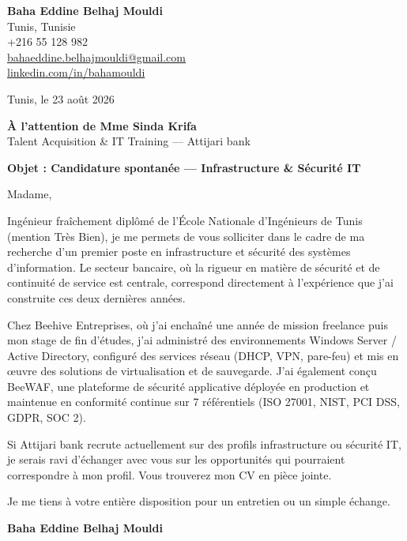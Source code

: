 \documentclass[a4paper,11pt]{article}
\begin{document}
\begin{flushright}
{\bfseries Baha Eddine Belhaj Mouldi}\\
Tunis, Tunisie\\
+216 55 128 982\\
\href{mailto:bahaeddine.belhajmouldi@gmail.com}{bahaeddine.belhajmouldi@gmail.com}\\
\href{https://linkedin.com/in/bahamouldi}{linkedin.com/in/bahamouldi}
\end{flushright}
\vspace{0.8cm}
\begin{flushleft}
Tunis, le 23 ao\^ut 2026
\vspace{0.8cm}

{\bfseries \`A l'attention de Mme Sinda Krifa}\\
Talent Acquisition \& IT Training --- Attijari bank
\vspace{0.6cm}

{\bfseries Objet : Candidature spontan\'ee --- Infrastructure \& S\'ecurit\'e IT}
\end{flushleft}
\vspace{0.6cm}
Madame,

Ing\'enieur fra\^ichement dipl\^om\'e de l'\'Ecole Nationale d'Ing\'enieurs de Tunis (mention Tr\`es Bien), je me permets de vous solliciter dans le cadre de ma recherche d'un premier poste en infrastructure et s\'ecurit\'e des syst\`emes d'information. Le secteur bancaire, o\`u la rigueur en mati\`ere de s\'ecurit\'e et de continuit\'e de service est centrale, correspond directement \`a l'exp\'erience que j'ai construite ces deux derni\`eres ann\'ees.

Chez Beehive Entreprises, o\`u j'ai encha\^in\'e une ann\'ee de mission freelance puis mon stage de fin d'\'etudes, j'ai administr\'e des environnements Windows Server / Active Directory, configur\'e des services r\'eseau (DHCP, VPN, pare-feu) et mis en \oe uvre des solutions de virtualisation et de sauvegarde. J'ai \'egalement con\c cu BeeWAF, une plateforme de s\'ecurit\'e applicative d\'eploy\'ee en production et maintenue en conformit\'e continue sur 7 r\'ef\'erentiels (ISO 27001, NIST, PCI DSS, GDPR, SOC 2).

Si Attijari bank recrute actuellement sur des profils infrastructure ou s\'ecurit\'e IT, je serais ravi d'\'echanger avec vous sur les opportunit\'es qui pourraient correspondre \`a mon profil. Vous trouverez mon CV en pi\`ece jointe.

Je me tiens \`a votre enti\`ere disposition pour un entretien ou un simple \'echange.

\vspace{0.8cm}
\begin{flushright}
{\bfseries Baha Eddine Belhaj Mouldi}
\end{flushright}
\end{document}
